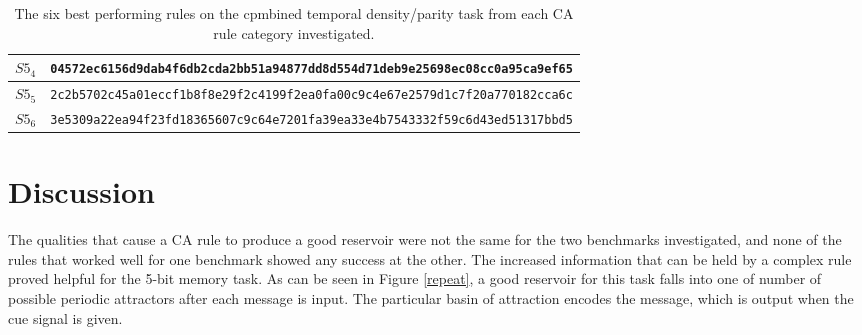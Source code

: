 \documentclass{elsarticle}
\begin{document}
\begin{multicols}{2}
\begin{table}[!htbp]
\begin{tabular}{|p{2cm}|l|}
\\ \hline
$S5_{4}$  &
\verb|04572ec6156d9dab4f6db2cda2bb51a94877dd8d554d71deb9e25698ec08cc0a95ca9ef65| 
\\ \hline
$S5_{5}$ &
\verb|2c2b5702c45a01eccf1b8f8e29f2c4199f2ea0fa00c9c4e67e2579d1c7f20a770182cca6c| 
\\ \hline
$S5_{6}$ &
\verb|3e5309a22ea94f23fd18365607c9c64e7201fa39ea33e4b7543332f59c6d43ed51317bbd5| 
\\ \hline
\end{tabular}
\caption{The six best performing rules on the cpmbined temporal density/parity 
   task from each CA rule category investigated.}
\label{table:rules_temp_dens}
\end{table}


\section{Discussion}\label{discussion}
The qualities that cause a CA rule to produce a good reservoir were not the 
   same for the two benchmarks investigated, and none of the rules that worked 
   well for one benchmark showed any success at the other. The increased 
   information that can be held by a complex rule proved helpful for the 5-bit 
   memory task. As can be seen in Figure \ref{repeat}, a good reservoir for 
   this task falls into one of number of possible  periodic attractors after 
   each message is input. The particular basin of attraction encodes the 
   message, which is output when the cue signal is given. 
   

\end{multicols}
\end{document}
